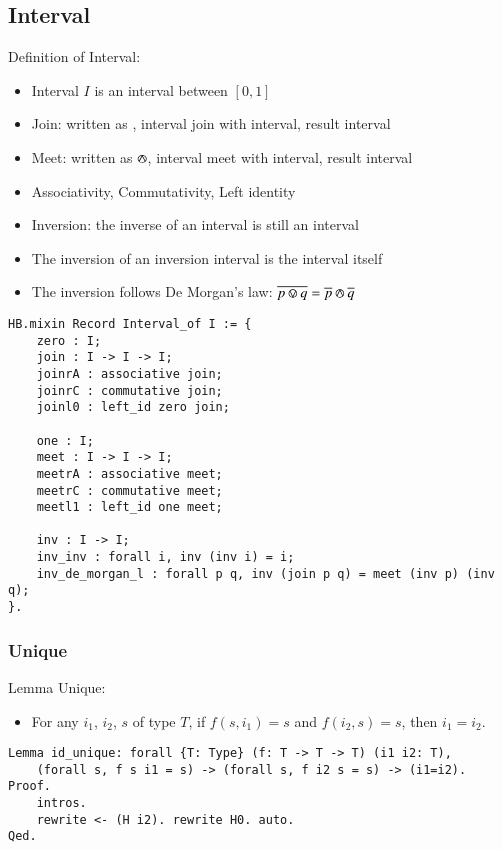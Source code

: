 \documentclass[a4paper,10pt]{article} %
\newcommand{\meet}{\circledwedge}
\newcommand{\join}{\circledvee}
\begin{document}
\subsection{Interval}
Definition of Interval:
\begin{itemize}
    \item Interval \(I\) is an interval between \([0, 1]\)
    \item Join: written as \join, interval join with interval, result interval
    \item Meet: written as \(\meet\), interval meet with interval, result interval
    \item Associativity, Commutativity, Left identity
    \item Inversion: the inverse of an interval is still an interval
    \item The inversion of an inversion interval is the interval itself
    \item The inversion follows De Morgan's law: \(\overline{p \join q} = \overline{p} \meet \overline{q}\)
\end{itemize}
\begin{lstlisting}
HB.mixin Record Interval_of I := {
    zero : I;
    join : I -> I -> I;
    joinrA : associative join;
    joinrC : commutative join;
    joinl0 : left_id zero join;

    one : I;
    meet : I -> I -> I;
    meetrA : associative meet;
    meetrC : commutative meet;
    meetl1 : left_id one meet;

    inv : I -> I;
    inv_inv : forall i, inv (inv i) = i;
    inv_de_morgan_l : forall p q, inv (join p q) = meet (inv p) (inv q);
}.
\end{lstlisting}

\subsubsection{Unique}
Lemma Unique: 
\begin{itemize}
    \item For any \(i_1\), \(i_2\), \(s\) of type \(T\), if \(f(s, i_1) = s\) and \(f(i_2, s) = s\), then \(i_1 = i_2\).
\end{itemize}
\begin{lstlisting}
Lemma id_unique: forall {T: Type} (f: T -> T -> T) (i1 i2: T),
    (forall s, f s i1 = s) -> (forall s, f i2 s = s) -> (i1=i2).
Proof.
    intros.
    rewrite <- (H i2). rewrite H0. auto.
Qed. 
\end{lstlisting}
\end{document}
